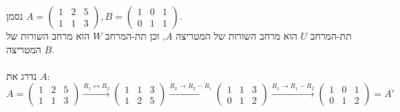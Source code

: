 \documentclass{article}
\begin{document}
נסמן $A=\begin{pmatrix}
        1 & 2 & 5 \\
        1 & 1 & 3
    \end{pmatrix}, B = \begin{pmatrix}
        1 & 0 & 1 \\
        0 & 1 & 1
    \end{pmatrix}$. \\
תת-המרחב $U$ הוא מרחב השורות של המטריצה $A$,
וכן תת-המרחב $W$ הוא מרחב השורות של המטריצה $B$. \\
\\
נדרג את $A$:
\[
    A=\begin{pmatrix}
        1 & 2 & 5 \\
        1 & 1 & 3
    \end{pmatrix} \xrightarrow{R_1\leftrightarrow R_2}
    \begin{pmatrix}
        1 & 1 & 3 \\
        1 & 2 & 5
    \end{pmatrix} \xrightarrow{R_2\rightarrow R_2-R_1}
    \begin{pmatrix}
        1 & 1 & 3 \\
        0 & 1 & 2
    \end{pmatrix} \xrightarrow{R_1\rightarrow R_1-R_2}
    \begin{pmatrix}
        1 & 0 & 1 \\
        0 & 1 & 2
    \end{pmatrix}=A'
\]
\end{document}
